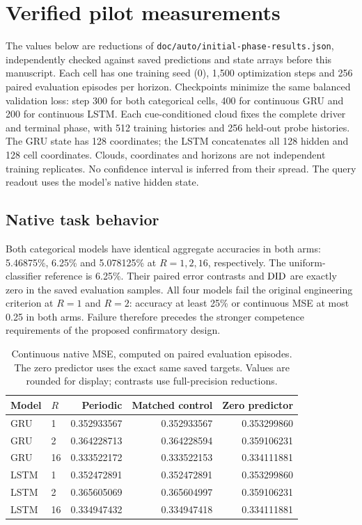 \section{Verified pilot measurements}
\label{app:pilot-details}
The values below are reductions of \texttt{doc/auto/initial-phase-results.json},
independently checked against saved predictions and state arrays before this manuscript.
Each cell has one training seed (0), 1,500 optimization steps and 256 paired
evaluation episodes per horizon. Checkpoints minimize the same balanced validation loss:
step 300 for both categorical cells, 400 for continuous GRU and 200 for continuous LSTM.
Each cue-conditioned cloud fixes the complete driver and terminal phase, with 512
training histories and 256 held-out probe histories. The GRU state has 128 coordinates;
the LSTM concatenates all 128 hidden and 128 cell coordinates. Clouds, coordinates and
horizons are not independent training replicates. No confidence interval is inferred
from their spread. The query readout uses the model's native hidden state.

\subsection{Native task behavior}
Both categorical models have identical aggregate accuracies in both arms:
5.46875\%, 6.25\% and 5.078125\% at $R=1,2,16$, respectively.
The uniform-classifier reference is 6.25\%. Their paired error contrasts and
$\mathrm{DID}$ are exactly zero in the saved evaluation samples. All four models fail
the original engineering criterion at $R=1$ and $R=2$: accuracy at least 25\%
or continuous MSE at most 0.25 in both arms. Failure therefore precedes the
stronger competence requirements of the proposed confirmatory design.

\begin{table}[htbp]
\centering\small
\caption{Continuous native MSE, computed on paired evaluation episodes. The zero predictor uses the exact same saved targets. Values are rounded for display; contrasts use full-precision reductions.}
\label{tab:pilot-native}
\begin{tabular}{llrrr}
\toprule
Model & $R$ & Periodic & Matched control & Zero predictor \\
\midrule
GRU & 1 & 0.352933567 & 0.352933567 & 0.353299860 \\
GRU & 2 & 0.364228713 & 0.364228594 & 0.359106231 \\
GRU & 16 & 0.333522172 & 0.333522153 & 0.334111881 \\
LSTM & 1 & 0.352472891 & 0.352472891 & 0.353299860 \\
LSTM & 2 & 0.365605069 & 0.365604997 & 0.359106231 \\
LSTM & 16 & 0.334947432 & 0.334947418 & 0.334111881 \\
\bottomrule
\end{tabular}
\end{table}

